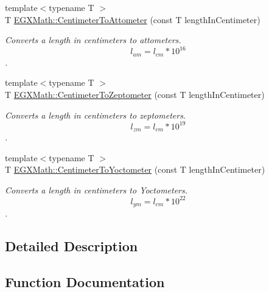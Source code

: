 \begin{DoxyCompactItemize}
{\footnotesize template$<$typename T $>$ }\\T \mbox{\hyperlink{group___e_g_x_math-_conversions-_length_conversions-_centimeter-_s_i_ga72eb99d67c7923a3b17886b47a0fa14d}{E\+G\+X\+Math\+::\+Centimeter\+To\+Attometer}} (const T length\+In\+Centimeter)
\begin{DoxyCompactList}\small\item\em Converts a length in centimeters to attometers. \[ l_{am}=l_{cm} * 10^{16} \]. \end{DoxyCompactList}\item 
{\footnotesize template$<$typename T $>$ }\\T \mbox{\hyperlink{group___e_g_x_math-_conversions-_length_conversions-_centimeter-_s_i_ga1f7a10f9710f514dcc9132d4ce1f0bfa}{E\+G\+X\+Math\+::\+Centimeter\+To\+Zeptometer}} (const T length\+In\+Centimeter)
\begin{DoxyCompactList}\small\item\em Converts a length in centimeters to zeptometers. \[ l_{zm}=l_{cm} * 10^{19} \]. \end{DoxyCompactList}\item 
{\footnotesize template$<$typename T $>$ }\\T \mbox{\hyperlink{group___e_g_x_math-_conversions-_length_conversions-_centimeter-_s_i_ga251be5adc836253a22a995d9f2ce6782}{E\+G\+X\+Math\+::\+Centimeter\+To\+Yoctometer}} (const T length\+In\+Centimeter)
\begin{DoxyCompactList}\small\item\em Converts a length in centimeters to Yoctometers. \[ l_{ym}=l_{cm} * 10^{22} \]. \end{DoxyCompactList}\end{DoxyCompactItemize}


\subsection{Detailed Description}


\subsection{Function Documentation}
\mbox{\label{group___e_g_x_math-_conversions-_length_conversions-_centimeter-_s_i_ga72eb99d67c7923a3b17886b47a0fa14d}} 
